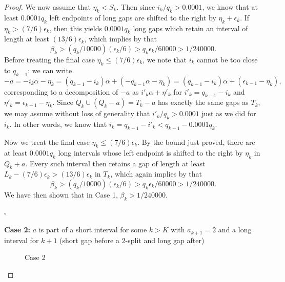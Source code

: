 \documentclass[10pt,a4paper]{amsart}
\begin{document}
\begin{proof}
We now assume that $\eta_k < S_k$. Then since $i_k/q_k > 0.0001$, we know that at least $0.0001q_k$ left endpoints of long gaps are shifted to the right by $\eta_k + \epsilon_k$. If $\eta_k > (7/6) \epsilon_k$, then this yields $0.0001q_k$ long gaps which retain an interval of length at least $(13/6) \epsilon_k$, which implies by  that
\[
\beta_k > (q_k/10000)(\epsilon_k/6) > q_k \epsilon_k/60000 > 1/240000.
\]
Before treating the final case $\eta_k \leq (7/6) \epsilon_k$, we note that $i_k$ cannot be too close to $q_{k-1}$: we can write
\[
-a = -i_k \alpha - \eta_k = (q_{k-1} - i_k) \alpha + (-q_{k-1} \alpha - \eta_k) = (q_{k-1} - i_k)\alpha + (\epsilon_{k-1} - \eta_k),
\]
corresponding to a decomposition of $-a$ as $i'_k \alpha + \eta'_k$ for $i'_k = q_{k-1} - i_k$ and 
$\eta'_k = \epsilon_{k-1} - \eta_k$. Since $Q_k \cup (Q_k - a) = T_k - a$ has exactly the same gaps as $T_k$, we may assume without loss of generality that $i'_k/q_k > 0.0001$ just as we did for $i_k$. In other words, we know that $i_k = q_{k-1} - i'_k < q_{k-1} - 0.0001q_k$. 

Now we treat the final case $\eta_k \leq (7/6) \epsilon_k$. By the bound just proved, there are at least $0.0001 q_k$ long intervals whose left endpoint is shifted to the right by $\eta_k$ in $Q_k + a$. Every such interval then retains a gap of length at least $L_k - (7/6)\epsilon_k > (13/6) \epsilon_k$ in $T_k$, which again implies by  that
\[
\beta_k > (q_k/10000)(\epsilon_k/6) > q_k \epsilon_k/60000 > 1/240000.
\]
We have then shown that in Case 1, $\beta_k > 1/240000$. 
\begin{flushright}
    $\square$\\
\end{flushright}

\noindent
\textbf{Case 2:} $a$ is part of a short interval for some $k > K$ with $a_{k+1} = 2$ and a long interval for $k+1$ 
(short gap before a $2$-split and long gap after)\\

\begin{figure}[h]
\centering
{}
\caption{Case 2}\label{fig2}
\end{figure}


\end{proof}
\end{document}
